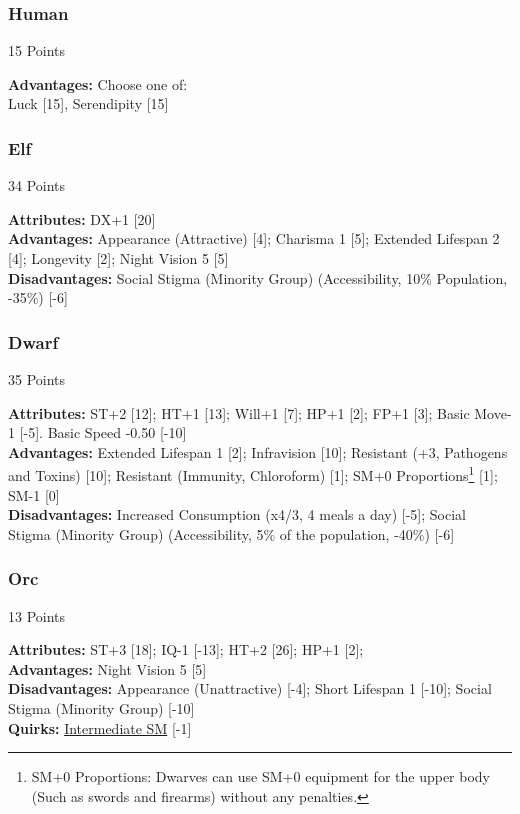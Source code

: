 \begin{multicols*}{3}
	\subsubsection*{Human}
	\begin{flushright}
		15 Points
	\end{flushright}
	\textbf{Advantages:} 
	Choose one of: \\
	Luck [15], Serendipity [15]
	
	\subsubsection*{Elf}
	\begin{flushright}
		34 Points
	\end{flushright}
	\textbf{Attributes:} 
	DX+1 [20]
	\\\textbf{Advantages:} 
	Appearance (Attractive) [4]; Charisma 1 [5]; Extended Lifespan 2 [4]; Longevity [2]; Night Vision 5 [5]
	\\\textbf{Disadvantages:} 
	Social Stigma (Minority Group) (Accessibility, 10\% Population, -35\%) [-6]
	
	\subsubsection*{Dwarf}
	\begin{flushright}
		35 Points
	\end{flushright}
	\textbf{Attributes:}
	ST+2 [12]; HT+1 [13]; Will+1 [7]; HP+1 [2]; FP+1 [3]; Basic Move-1 [-5]. Basic Speed -0.50 [-10]
	\\\textbf{Advantages:} 
	Extended Lifespan 1 [2]; Infravision [10]; Resistant (+3, Pathogens and Toxins) [10]; Resistant (Immunity, Chloroform) [1]; SM+0 Proportions\footnote{SM+0 Proportions: Dwarves can use SM+0 equipment for the upper body (Such as swords and firearms) without any penalties.} [1]; SM-1 [0]
	\\\textbf{Disadvantages:} 
	Increased Consumption (x4/3, 4 meals a day) [-5]; Social Stigma (Minority Group) (Accessibility, 5\% of the population, -40\%) [-6]
	
	\subsubsection*{Orc}
	\begin{flushright}
		13 Points
	\end{flushright}
	\textbf{Attributes:}
	ST+3 [18]; IQ-1 [-13]; HT+2 [26]; HP+1 [2];
	\\\textbf{Advantages:} 
	Night Vision 5 [5]
	\\\textbf{Disadvantages:} 
	Appearance (Unattractive) [-4]; Short Lifespan 1 [-10]; Social Stigma (Minority Group) [-10]
	\\\textbf{Quirks:}
	\hyperref[intermediate_sm]{Intermediate SM} [-1]
	

\end{multicols*}
